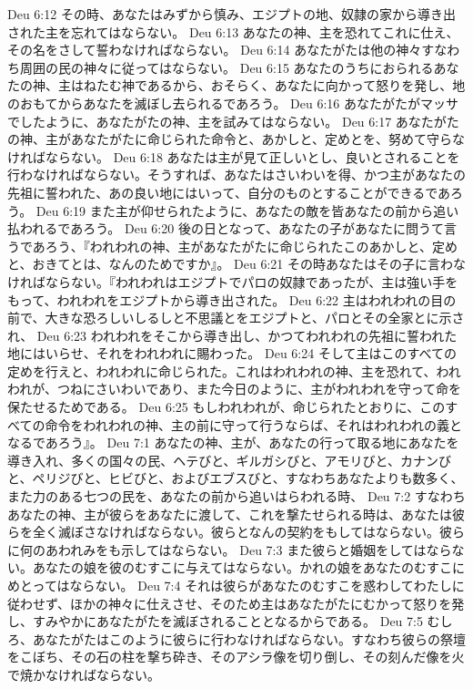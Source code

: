 Deu 6:12  その時、あなたはみずから慎み、エジプトの地、奴隷の家から導き出された主を忘れてはならない。
Deu 6:13  あなたの神、主を恐れてこれに仕え、その名をさして誓わなければならない。
Deu 6:14  あなたがたは他の神々すなわち周囲の民の神々に従ってはならない。
Deu 6:15  あなたのうちにおられるあなたの神、主はねたむ神であるから、おそらく、あなたに向かって怒りを発し、地のおもてからあなたを滅ぼし去られるであろう。
Deu 6:16  あなたがたがマッサでしたように、あなたがたの神、主を試みてはならない。
Deu 6:17  あなたがたの神、主があなたがたに命じられた命令と、あかしと、定めとを、努めて守らなければならない。
Deu 6:18  あなたは主が見て正しいとし、良いとされることを行わなければならない。そうすれば、あなたはさいわいを得、かつ主があなたの先祖に誓われた、あの良い地にはいって、自分のものとすることができるであろう。
Deu 6:19  また主が仰せられたように、あなたの敵を皆あなたの前から追い払われるであろう。
Deu 6:20  後の日となって、あなたの子があなたに問うて言うであろう、『われわれの神、主があなたがたに命じられたこのあかしと、定めと、おきてとは、なんのためですか』。
Deu 6:21  その時あなたはその子に言わなければならない。『われわれはエジプトでパロの奴隷であったが、主は強い手をもって、われわれをエジプトから導き出された。
Deu 6:22  主はわれわれの目の前で、大きな恐ろしいしるしと不思議とをエジプトと、パロとその全家とに示され、
Deu 6:23  われわれをそこから導き出し、かつてわれわれの先祖に誓われた地にはいらせ、それをわれわれに賜わった。
Deu 6:24  そして主はこのすべての定めを行えと、われわれに命じられた。これはわれわれの神、主を恐れて、われわれが、つねにさいわいであり、また今日のように、主がわれわれを守って命を保たせるためである。
Deu 6:25  もしわれわれが、命じられたとおりに、このすべての命令をわれわれの神、主の前に守って行うならば、それはわれわれの義となるであろう』。
Deu 7:1  あなたの神、主が、あなたの行って取る地にあなたを導き入れ、多くの国々の民、ヘテびと、ギルガシびと、アモリびと、カナンびと、ペリジびと、ヒビびと、およびエブスびと、すなわちあなたよりも数多く、また力のある七つの民を、あなたの前から追いはらわれる時、
Deu 7:2  すなわちあなたの神、主が彼らをあなたに渡して、これを撃たせられる時は、あなたは彼らを全く滅ぼさなければならない。彼らとなんの契約をもしてはならない。彼らに何のあわれみをも示してはならない。
Deu 7:3  また彼らと婚姻をしてはならない。あなたの娘を彼のむすこに与えてはならない。かれの娘をあなたのむすこにめとってはならない。
Deu 7:4  それは彼らがあなたのむすこを惑わしてわたしに従わせず、ほかの神々に仕えさせ、そのため主はあなたがたにむかって怒りを発し、すみやかにあなたがたを滅ぼされることとなるからである。
Deu 7:5  むしろ、あなたがたはこのように彼らに行わなければならない。すなわち彼らの祭壇をこぼち、その石の柱を撃ち砕き、そのアシラ像を切り倒し、その刻んだ像を火で焼かなければならない。
